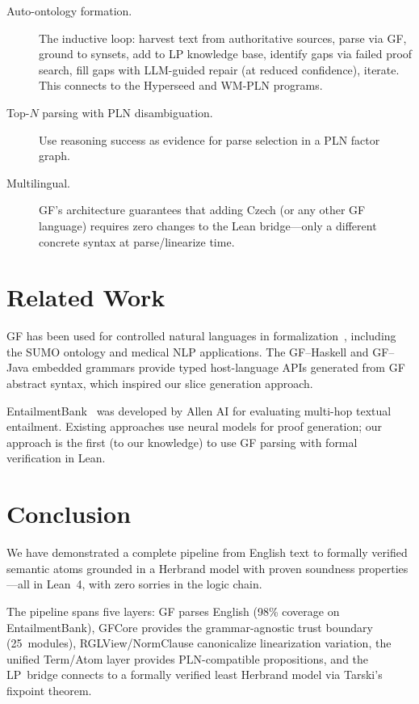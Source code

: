 \documentclass[]{article}
\newcommand{\GFCore}{\textup{GFCore}}
\begin{document}
\begin{description}
\item[Auto-ontology formation.] The inductive loop: harvest text
  from authoritative sources, parse via GF, ground to synsets, add
  to LP knowledge base, identify gaps via failed proof search, fill
  gaps with LLM-guided repair (at reduced confidence), iterate.
  This connects to the Hyperseed and WM-PLN programs.

\item[Top-$N$ parsing with PLN disambiguation.] Use reasoning success
  as evidence for parse selection in a PLN factor graph.

\item[Multilingual.] GF's architecture guarantees that adding
  Czech (or any other GF language) requires zero changes to the
  Lean bridge---only a different concrete syntax at parse/linearize
  time.
\end{description}

\section{Related Work}
\label{sec:related}

GF has been used for controlled natural languages in
formalization~\cite{ranta2011gf}, including the SUMO ontology
and medical NLP applications. The GF--Haskell and GF--Java
embedded grammars provide typed host-language APIs generated from
GF abstract syntax, which inspired our slice generation approach.

EntailmentBank~\cite{dalvi2021entailmentbank} was developed by
Allen AI for evaluating multi-hop textual entailment. Existing
approaches use neural models for proof generation; our approach
is the first (to our knowledge) to use GF parsing with formal
verification in Lean.

\section{Conclusion}

We have demonstrated a complete pipeline from English text to
formally verified semantic atoms grounded in a Herbrand model with
proven soundness properties---all in Lean~4, with zero sorries in
the logic chain.

The pipeline spans five layers: GF parses English (98\% coverage on
EntailmentBank), \GFCore{} provides the grammar-agnostic trust boundary
(25~modules), RGLView/NormClause canonicalize linearization variation, the
unified Term/Atom layer provides PLN-compatible propositions, and the
LP~bridge connects to a formally verified least Herbrand model via
Tarski's fixpoint theorem.
\end{document}
